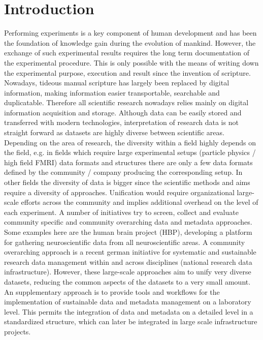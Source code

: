 \clearpage
\chapter{Introduction}
\label{sec:intro}

Performing experiments is a key component of human development and has been the foundation of knowledge gain during the evolution of mankind. However, the exchange of such experimental results requires the long term documentation of the  experimental procedure. This is only possible with the means of writing down the experimental purpose, execution and result since the invention of scripture. Nowadays, tideous manual scripture has largely been replaced by digital information, making information easier transportable, searchable and duplicatable. Therefore all scientific research nowadays relies mainly on digital information acquisition and storage. Although data can be easily stored and transferred with modern technologies, interpretation of research data is not straight forward as datasets are highly diverse between scientific areas. Depending on the area of research, the diversity within a field highly depends on the field, e.g. in fields which require large experimental setups (particle physics / high field FMRI) data formats and structures  there are only a few data formats defined by the community / company producing the corresponding setup. In other fields the diversity of data is bigger since the scientific methods and aims require a diversity of approaches. Unification would require organizational large-scale efforts across the community and implies additional overhead on the level of each experiment. A number of initiatives try to screen, collect and evaluate community specific and community overarching data and metadata approaches. Some examples here are the human brain project (HBP), developing a platform for gathering neuroscientific data from all neuroscientific areas. A community overarching approach is a recent german initiative for systematic and sustainable research data management within and across disciplines (national research data infrastructure). However, these large-scale approaches aim to unify very diverse datasets, reducing the common aspects of the datasets to a very small amount. An supplementary approach is to provide tools and workflows for the implementation of sustainable data and metadata management on a laboratory level. This permits the integration of data and metadata on a detailed level in a standardized structure, which can later be integrated in large scale infrastructure projects.

